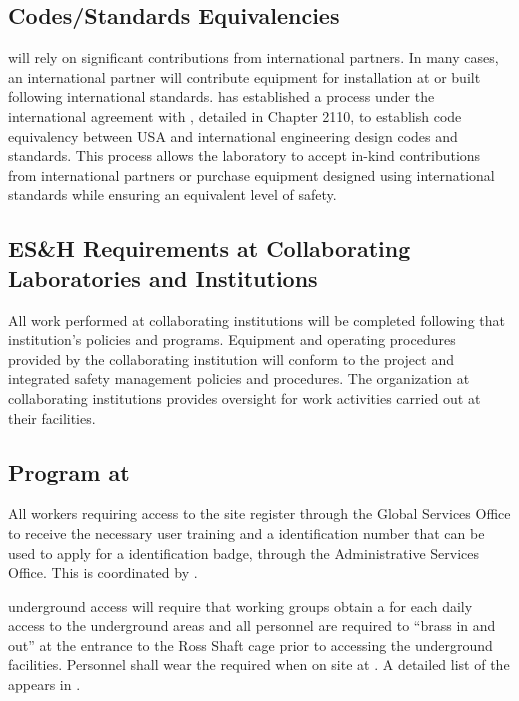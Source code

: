 \subsection{Codes/Standards Equivalencies}
\label{sec:es-tc-esh_codes}

 will rely on significant contributions from international
partners. In many cases, an international partner will contribute
equipment for installation at  or  built
following international standards.  has established a
process under the international agreement with , detailed
in  Chapter 2110, to establish code equivalency between
USA and international engineering design codes and standards. This
process allows the laboratory to accept in-kind contributions from
international partners or purchase equipment designed using
international standards while ensuring an equivalent level
of safety.



\subsection{ES\&H Requirements at Collaborating Laboratories and Institutions}

All work performed at collaborating institutions will be completed
following that institution's  policies and
programs. Equipment and operating procedures provided by the
collaborating institution will conform to the  project
 and integrated safety management policies and
procedures. The  organization at collaborating institutions
provides  oversight for work activities carried
out at their facilities.

\subsection{  Program at }

All  workers requiring access to the  site
register through the \fnal Global Services Office to receive the
necessary user training and a \fnal identification number that can be
used to apply for a  identification badge, through the
 Administrative Services Office. This is coordinated by
. 

 underground access will require that working groups
obtain a  for each daily access to the
underground areas and all personnel are required to ``brass in and
out'' at the entrance to the Ross Shaft
cage prior to accessing the underground facilities.
 Personnel shall wear the required  when on site at . 
A detailed list of the  appears in \tcchesh. 


